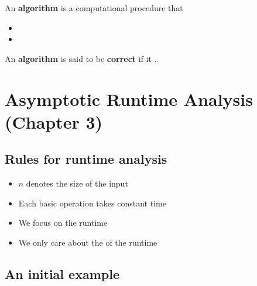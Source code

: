 \documentclass[11  pt]{article}
\begin{document}
\begin{definition} \noindent An \textbf{algorithm} is a computational procedure that
	
	\begin{itemize}
		\item {}
		\item  {}
	\end{itemize}
	
An \textbf{algorithm} is said to be \textbf{correct} if it .
\end{definition}

\vspace{2in}


\section{Asymptotic Runtime Analysis (Chapter 3)}

\subsection{Rules for runtime analysis}
\begin{itemize}
		\setlength\itemsep{2em}
		\item $n$ denotes the size of the input
	\item Each basic operation takes constant time
	\item We focus on the  runtime
	\item We only care about the  of the runtime
\end{itemize}

\vspace{1in}
\subsection{An initial example}
%
\end{document}
